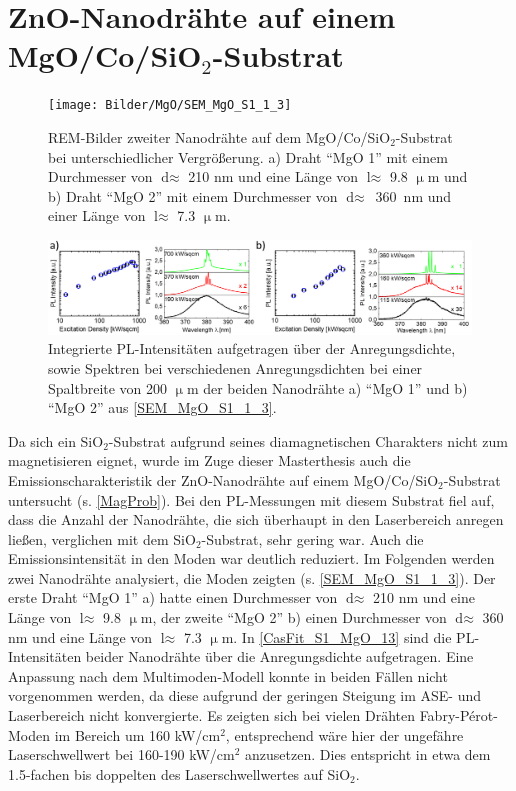 \section{ZnO-Nanodrähte auf einem MgO/Co/SiO$_\text{2}$-Substrat}\begin{figure}[t]
\texttt{[image: Bilder/MgO/SEM\_MgO\_S1\_1\_3]}
\caption{REM-Bilder zweiter Nanodrähte auf dem  MgO/Co/SiO$_\text{2}$-Substrat bei unterschiedlicher Vergrößerung. a) Draht ``MgO 1'' mit einem Durchmesser von $\text{d} \approx$ 210 nm und eine Länge von $\text{l} \approx$ 9.8 $\upmu$m und b) Draht ``MgO 2'' mit einem Durchmesser von \mbox{$\text{d} \approx$ 360 nm} und einer Länge von $\text{l} \approx$ 7.3 $\upmu$m.}
\label{SEM_MgO_S1_1_3}
\centering
\includegraphics[width=1\textwidth]{Bilder/MgO/CasFit_S1_MgO_1und3}
\caption{Integrierte PL-Intensitäten aufgetragen über der Anregungsdichte, sowie Spektren bei verschiedenen Anregungsdichten bei einer Spaltbreite von 200 $\upmu$m der beiden Nanodrähte a) ``MgO 1'' und b) ``MgO 2'' aus \autoref{SEM_MgO_S1_1_3}.}
\label{CasFit_S1_MgO_13}
\end{figure}
Da sich ein SiO$_\text{2}$-Substrat aufgrund seines diamagnetischen Charakters nicht zum magnetisieren eignet, wurde im Zuge dieser Masterthesis auch die Emissionscharakteristik der ZnO-Nanodrähte auf einem MgO/Co/SiO$_\text{2}$-Substrat untersucht (s. \autoref{MagProb}). Bei den PL-Messungen mit diesem Substrat fiel auf, dass die Anzahl der Nanodrähte, die sich überhaupt in den Laserbereich anregen ließen, verglichen mit dem SiO$_\text{2}$-Substrat, sehr gering war. Auch die Emissionsintensität in den Moden war deutlich reduziert. Im Folgenden werden zwei Nanodrähte analysiert, die Moden zeigten (s. \autoref{SEM_MgO_S1_1_3}). Der erste Draht ``MgO 1'' a) hatte einen Durchmesser von $\text{d} \approx$ 210 nm und eine Länge von $\text{l} \approx$ 9.8 $\upmu$m, der zweite ``MgO 2'' b) einen Durchmesser von $\text{d} \approx$ 360 nm und eine Länge von $\text{l} \approx$ 7.3 $\upmu$m. In \autoref{CasFit_S1_MgO_13} sind die PL-Intensitäten beider Nanodrähte über die Anregungsdichte aufgetragen. Eine Anpassung nach dem Multimoden-Modell konnte in beiden Fällen nicht vorgenommen werden, da diese aufgrund der geringen Steigung im ASE- und Laserbereich nicht konvergierte. Es zeigten sich bei vielen Drähten Fabry-Pérot-Moden im Bereich um 160 kW/cm$^\text{2}$, entsprechend wäre hier der ungefähre Laserschwellwert bei 160-190 kW/cm$^\text{2}$ anzusetzen. Dies entspricht in etwa dem 1.5-fachen bis doppelten des Laserschwellwertes auf SiO$_\text{2}$. 
